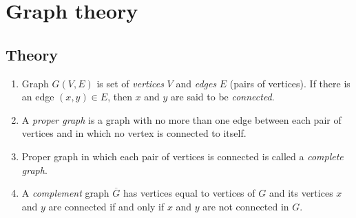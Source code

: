 \documentclass{article}
\begin{document}
\section*{Graph theory}
\subsection*{Theory}
\begin{enumerate}
	\item 
	Graph $G(V,E)$ is set of \emph{vertices} $V$ and \emph{edges} $E$ (pairs of vertices). If there is an edge $(x,y) \in E$, then $x$ and $y$ are said to be \emph{connected}.
	\item 
	A \emph{proper graph} is a graph with no more than one edge between each pair of vertices and in which no vertex is connected to itself.
	\item 
	Proper graph in which each pair of vertices is connected is called a \emph{complete graph}.
	\item
	A \emph{complement} graph $\overline{G}$ has vertices equal to vertices of $G$ and its vertices $x$ and $y$ are connected if and only if $x$ and $y$ are not connected in $G$.
	

\end{enumerate}
\end{document}
